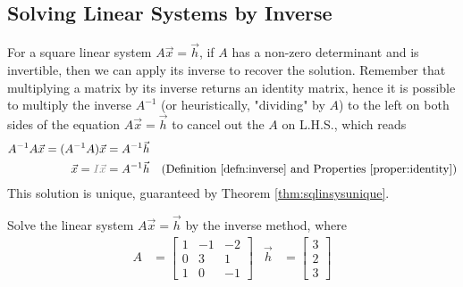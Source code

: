 \subsection{Solving Linear Systems by Inverse}
\label{subsection:SolLinSysInv}
For a square linear system $A\vec{x} = \vec{h}$, if $A$ has a non-zero determinant and is invertible, then we can apply its inverse to recover the solution. Remember that multiplying a matrix by its inverse returns an identity matrix, hence it is possible to multiply the inverse $A^{-1}$ (or heuristically, "dividing" by $A$) to the left on both sides of the equation $A\vec{x} = \vec{h}$ to cancel out the $A$ on L.H.S., which reads
\begin{align}
A^{-1}A\vec{x}= (A^{-1}A)\vec{x} &= A^{-1}\vec{h} \nonumber \\
\vec{x} = \textcolor{gray}{I\vec{x}} &= A^{-1}\vec{h} &\text{(Definition \ref{defn:inverse} and Properties \ref{proper:identity})} \label{eqn:inversesol}
\end{align}
This solution is unique, guaranteed by Theorem \ref{thm:sqlinsysunique}.
\begin{exmp}
Solve the linear system $A\vec{x} = \vec{h}$ by the inverse method, where
\begin{align*}
A &=
\begin{bmatrix}
1 & -1 & -2 \\
0 & 3 & 1 \\
1 & 0 & -1
\end{bmatrix}
& \vec{h} &=
\begin{bmatrix}
3 \\
2 \\
3
\end{bmatrix}
\end{align*}
\end{exmp}
